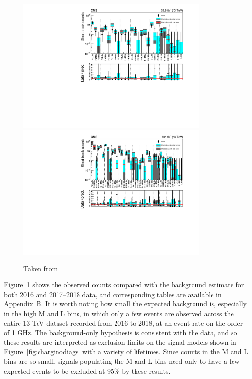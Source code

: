   \begin{figure}[h!]
    \centering
    \includegraphics[width=0.85\textwidth]{figures/MT2_2019/Figure_006-a.pdf}
    \includegraphics[width=0.85\textwidth]{figures/MT2_2019/Figure_006-b.pdf}
    \caption[Comparison of the predicted background and observed data events in the disappearing track search for (upper) 2016 and (lower) 2017--2018.]{Taken from \cite{MT2_2019}}
    \label{fig:distracksresults}
  \end{figure}  

  Figure~\ref{fig:distracksresults} shows the observed counts compared with the background estimate for both 2016 and 2017--2018 data, and corresponding tables are available in Appendix~B.
  It is worth noting how small the expected background is, especially in the high \pt M and L bins, in which only a few events are observed across the entire 13 TeV dataset recorded from 2016 to 2018, at an event rate on the order of 1 GHz.
  The background-only hypothesis is consistent with the data, and so these results are interpreted as exclusion limits on the signal models shown in Figure~\ref{fig:charginodiags} with a variety of lifetimes.
  Since counts in the M and L bins are so small, signals populating the M and L bins need only to have a few expected events to be excluded at 95\% \CL by these results.



